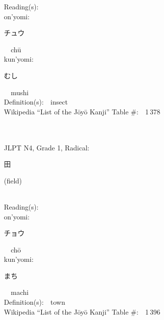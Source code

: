 \begin{multicols}{2}
Reading(s):\ \ \\
{\hspace*{1em}}on'yomi:\ \ \\
{\hspace*{2em}}{\begin{CJK}{UTF8}{min} チュウ \end{CJK}}\ \ ch\=u\ \ \\
{\hspace*{1em}}kun'yomi:\ \ \\
{\hspace*{2em}}{\begin{CJK}{UTF8}{min} むし \end{CJK}}\ \ mushi\ \ \\
Definition(s):\ \ insect \\
Wikipedia ``List of the J\=oy\=o Kanji'' Table \#:\ \ 1\,378 \\
\ \ \\
{\fontsize{34pt}{40pt}  }\ \ \\  %
{JLPT N4, Grade 1, Radical:\ \ {\begin{CJK}{UTF8}{min} 田 \end{CJK}} (field) } \\
Reading(s):\ \ \\
{\hspace*{1em}}on'yomi:\ \ \\
{\hspace*{2em}}{\begin{CJK}{UTF8}{min} チョウ \end{CJK}}\ \ ch\=o\ \ \\
{\hspace*{1em}}kun'yomi:\ \ \\
{\hspace*{2em}}{\begin{CJK}{UTF8}{min} まち \end{CJK}}\ \ machi\ \ \\
Definition(s):\ \ town \\
Wikipedia ``List of the J\=oy\=o Kanji'' Table \#:\ \ 1\,396 \\
\ \ \\
{\fontsize{34pt}{40pt}  }\ \ \\  %

\end{multicols}
